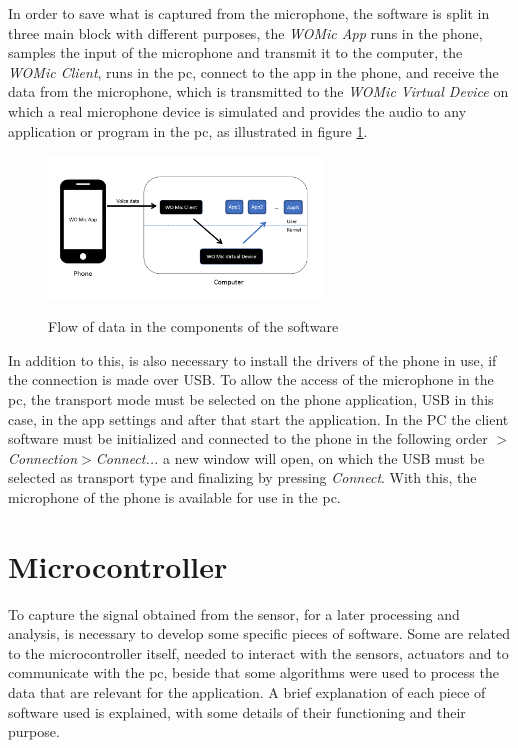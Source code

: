 In order to save what is captured from the microphone, the software is split in three main block with different purposes, the \textit{WOMic App} runs in the phone, samples the input of the microphone and transmit it to the computer, the \textit{WOMic Client}, runs in the \acrshort{pc}, connect to the app in the phone, and receive the data from the microphone, which is transmitted to the \textit{WOMic Virtual Device} on which a real microphone device is simulated and provides the audio to any application or program in the \acrshort{pc}, as illustrated in figure \ref{fig:diagramWOMIC}.

\begin{figure}[]
    \centering
    \includegraphics[width=0.65\textwidth]{Chapters/5CHP/Images/WOMICDiag.png}
    \caption{Flow of data in the components of the software}{\cite{WOMicFREE}}
    \label{fig:diagramWOMIC}
\end{figure}
In addition to this, is also necessary to install the drivers of the phone in use, if the connection is made over USB. To allow the access of the microphone in the \acrshort{pc}, the transport mode must be selected on the phone application, USB in this case, in the app settings and after that start the application. In the PC the client software must be initialized and connected to the phone in the following order \textit{$>$Connection$>$Connect...} a new window will open, on which the USB must be selected as transport type and finalizing by pressing \textit{Connect}. With this, the microphone of the phone is available for use in the \acrshort{pc}\cite{WOMicFREE}.
\section{Microcontroller}
%
To capture the signal obtained from the sensor, for a later processing and analysis, is necessary to develop some specific pieces of software. Some are related to the microcontroller itself, needed to interact with the sensors, actuators and to communicate with the \acrshort{pc}, beside that some algorithms were used to process the data that are relevant for the application. A brief explanation of each piece of software used is explained, with some details of their functioning and their purpose.

